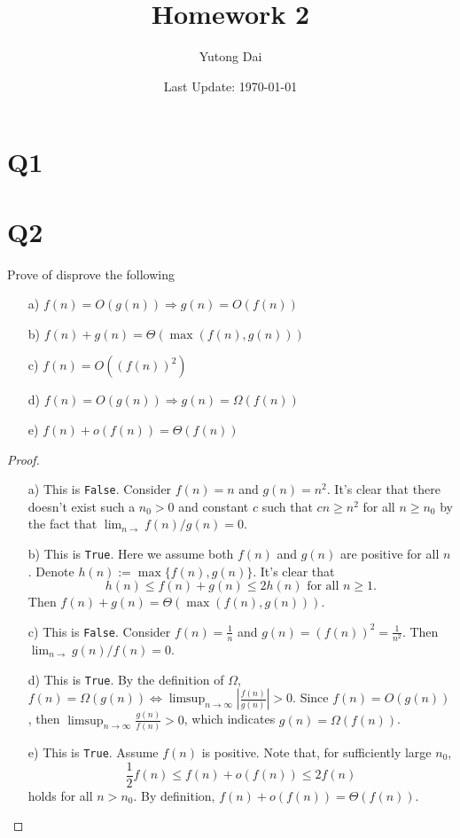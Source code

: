 \documentclass[10pt]{article}
\title{Homework 2}
\author{Yutong Dai}
\date{Last Update: \today}
\begin{document}
\maketitle


\section{Q1}

\section{Q2}
Prove of disprove the following

\begin{itemize}
\item [a)] $f(n)=O(g(n)) \Rightarrow g(n)=O(f(n))$
\item [b)] $f(n)+g(n)=\Theta(\max (f(n), g(n)))$
\item [c)] $f(n)=O\left((f(n))^{2}\right)$
\item [d)] $f(n)=O(g(n)) \Rightarrow g(n)=\Omega(f(n))$
\item [e)] $f(n)+o(f(n))=\Theta(f(n))$
\end{itemize}

\begin{proof}
\item 
\begin{itemize}
    \item [a)] This is \texttt{False}. Consider $f(n)=n$ and $g(n)=n^2$. It's clear that there doesn't exist such a $n_0>0$ and constant $c$ such that $cn\geq n^2$ for all $n\geq n_0$ by the fact that $\lim_{n
    \rightarrow} f(n)/g(n)=0$.
    
    \item [b)] This is \texttt{True}. Here we assume both $f(n)$ and $g(n)$ are positive for all $n$. Denote $h(n):=\max\{f(n), g(n)\}$. It's clear that 
    $$h(n) \leq f(n) + g(n) \leq 2 h(n) \text{ for all }n\geq 1.$$
    Then $f(n)+g(n)=\Theta(\max (f(n), g(n)))$.
    \item [c)] This is \texttt{False}. Consider $f(n)=\frac{1}{n}$ and $g(n)=(f(n))^2=\frac{1}{n^2}$. Then $\lim_{n
    \rightarrow} g(n)/f(n)=0$.
    \item [d)] This is \texttt{True}. By the definition of $\Omega$, $f(n)=\Omega(g(n)) \Leftrightarrow \limsup _{n \rightarrow \infty}\left|\frac{f(n)}{g(n)}\right|>0$. Since $f(n)=O(g(n))$, then $\limsup _{n \rightarrow \infty}\frac{g(n)}{f(n)}>0$, which indicates $g(n)=\Omega(f(n))$.
    \item [e)] This is \texttt{True}. Assume $f(n)$ is positive. Note that, for sufficiently large $n_0$,
    $$
        \frac{1}{2} f(n) \leq f(n) +o(f(n)) \leq 2f(n)
    $$
    holds for all $n>n_0$. By definition, $f(n)+o(f(n))=\Theta(f(n))$.
\end{itemize}
\end{proof}


% 
% 
\end{document}
